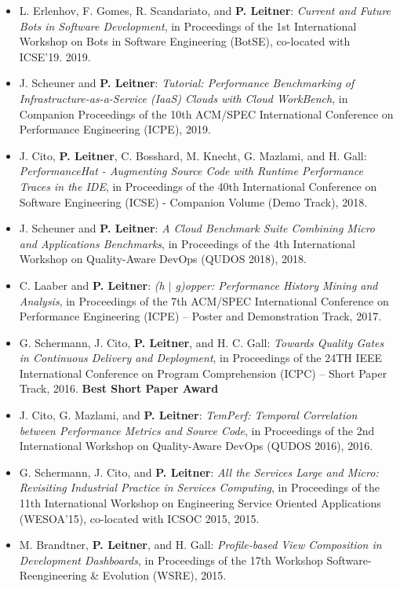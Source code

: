 \documentclass[paper=letter,fontsize=11pt]{scrartcl} %
\begin{document}
\begin{itemize}
	\item L. Erlenhov, F. Gomes, R. Scandariato, and \textbf{P. Leitner}: \emph{Current and Future Bots in Software Development}, in Proceedings of the 1st International Workshop on
Bots in Software Engineering (BotSE), co-located with ICSE'19. 2019.
	\item J. Scheuner and \textbf{P. Leitner}: \emph{Tutorial: Performance Benchmarking of Infrastructure-as-a-Service (IaaS) Clouds with Cloud WorkBench}, in Companion Proceedings of the 10th ACM/SPEC International Conference on Performance Engineering (ICPE), 2019.
	\item J. Cito, \textbf{P. Leitner}, C. Bosshard, M. Knecht, G. Mazlami, and H. Gall: \emph{PerformanceHat - Augmenting Source Code with Runtime Performance Traces in the IDE}, in Proceedings of the 40th International Conference on Software Engineering (ICSE) - Companion Volume (Demo Track), 2018.
	\item J. Scheuner and \textbf{P. Leitner}: \emph{A Cloud Benchmark Suite Combining Micro and Applications Benchmarks}, in Proceedings of the 4th International Workshop on Quality-Aware DevOps (QUDOS 2018), 2018.
	\item C. Laaber and \textbf{P. Leitner}: \emph{ (h $|$ g)opper: Performance History Mining and Analysis},  in Proceedings of the 7th ACM/SPEC International Conference on Performance Engineering (ICPE) -- Poster and Demonstration Track, 2017.
	\item G. Schermann, J. Cito, \textbf{P. Leitner}, and H. C. Gall: \emph{Towards Quality Gates in Continuous Delivery and Deployment}, in Proceedings of the 24TH IEEE International Conference on Program Comprehension (ICPC) – Short Paper Track, 2016. \textbf{Best Short Paper Award}
	\item J. Cito, G. Mazlami, and \textbf{P. Leitner}: \emph{TemPerf: Temporal Correlation between Performance Metrics and Source Code}, in Proceedings of the 2nd International Workshop on Quality-Aware DevOps (QUDOS 2016), 2016.
    \item G. Schermann, J. Cito, and \textbf{P. Leitner}: \emph{All the Services Large and Micro: Revisiting Industrial Practice in Services Computing}, in Proceedings of the 11th International Workshop on Engineering Service Oriented Applications (WESOA’15), co-located with ICSOC 2015, 2015.
    \item M. Brandtner, \textbf{P. Leitner}, and H. Gall: \emph{Profile-based View Composition in Development Dashboards}, in Proceedings of the 17th Workshop Software-Reengineering \& Evolution (WSRE), 2015.

\end{itemize}
\end{document}
